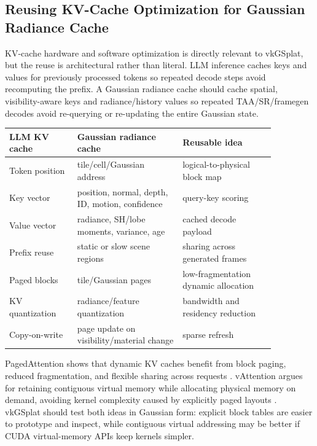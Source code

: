 \documentclass[11pt]{article}
\begin{document}
\subsection{Reusing KV-Cache Optimization for Gaussian Radiance Cache}

KV-cache hardware and software optimization is directly relevant to vkGSplat,
but the reuse is architectural rather than literal. LLM inference caches keys
and values for previously processed tokens so repeated decode steps avoid
recomputing the prefix. A Gaussian radiance cache should cache spatial,
visibility-aware keys and radiance/history values so repeated TAA/SR/framegen
decodes avoid re-querying or re-updating the entire Gaussian state.

\begin{center}
\small
\begin{tabular}{p{0.22\linewidth}p{0.34\linewidth}p{0.30\linewidth}}
\toprule
LLM KV cache & Gaussian radiance cache & Reusable idea \\
\midrule
Token position & tile/cell/Gaussian address & logical-to-physical block map \\
Key vector & position, normal, depth, ID, motion, confidence & query-key scoring \\
Value vector & radiance, SH/lobe moments, variance, age & cached decode payload \\
Prefix reuse & static or slow scene regions & sharing across generated frames \\
Paged blocks & tile/Gaussian pages & low-fragmentation dynamic allocation \\
KV quantization & radiance/feature quantization & bandwidth and residency reduction \\
Copy-on-write & page update on visibility/material change & sparse refresh \\
\bottomrule
\end{tabular}
\end{center}

PagedAttention shows that dynamic KV caches benefit from block paging, reduced
fragmentation, and flexible sharing across requests \cite{kwon2023pagedattention}.
vAttention argues for retaining contiguous virtual memory while allocating
physical memory on demand, avoiding kernel complexity caused by explicitly
paged layouts \cite{prabhu2025vattention}. vkGSplat should test both ideas in
Gaussian form: explicit block tables are easier to prototype and inspect, while
contiguous virtual addressing may be better if CUDA virtual-memory APIs keep
kernels simpler.
\end{document}
